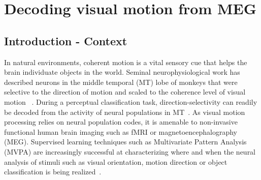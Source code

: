 
\chapter{Decoding visual motion from MEG}
\label{chapter:decoding}
\noindent\makebox[\linewidth]{\rule{0.75\paperwidth}{0.4pt}}
\noindent\makebox[\linewidth]{\rule{0.75\paperwidth}{0.4pt}}

\localtableofcontents %

\noindent\makebox[\linewidth]{\rule{0.75\paperwidth}{0.4pt}}
\noindent\makebox[\linewidth]{\rule{0.75\paperwidth}{0.4pt}}
\newpage

\section{Introduction - Context}
In natural environments, coherent motion is a vital sensory cue that helps the brain individuate objects in the world. Seminal neurophysiological work has described neurons in the middle temporal (MT) lobe of monkeys that were selective to the direction of motion and scaled to the coherence level of visual motion~\cite{2britten1992analysis} . During a perceptual classification task, direction-selectivity can readily be decoded from the activity of neural populations in MT~\cite{3jazayeri2006optimal,4rust2006mt}. As visual motion processing relies on neural population codes, it is amenable to non-invasive functional human brain imaging such as fMRI or magnetoencephalography (MEG). Supervised learning techniques such as Multivariate Pattern Analysis (MVPA) are increasingly successful at characterizing where and when the neural analysis of stimuli such as visual orientation, motion direction or object classification is being realized~\cite{5kamitani2005decoding,6wessberg2000real,7haynes2006decoding,8poldrack2011inferring,9cichy2014resolving,10horikawa2013neural,11haynes2015primer,wardle2016perceptual,ritchie2016neural,nakamura2003human,handel2008selective,amano2006estimation}.

